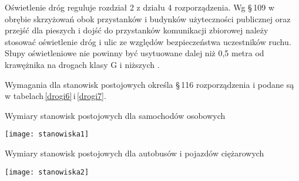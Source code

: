 \documentclass[twoside,12pt]{article}
\begin{document}
	Oświetlenie dróg reguluje rozdział 2 z działu 4 rozporządzenia. Wg §\,109 w obrębie skrzyżowań obok przystanków i budynków użyteczności publicznej oraz przejść dla pieszych i dojść do przystanków komunikacji zbiorowej należy stosować oświetlenie dróg i ulic ze względów bezpieczeństwa uczestników ruchu. Słupy oświetleniowe nie powinny być usytuowane dalej niż 0,5 metra od krawężnika na drogach klasy G i niższych \cite{rozporzadzenie_drogi}.
	
	Wymagania dla stanowisk postojowych określa §\,116 rozporządzenia i podane są w tabelach\,\ref{drogi6}\,i\,\ref{drogi7}.
	\begin{table}[H]
		\centering
		\caption{Wymiary stanowisk postojowych dla samochodów osobowych}
		\texttt{[image: stanowiska1]}\\
		\label{drogi6}
	\end{table}	
	
	\begin{table}[H]
		\centering
		\caption{Wymiary stanowisk postojowych dla autobusów i pojazdów ciężarowych}
		\texttt{[image: stanowiska2]}\\
		\label{drogi7}
	\end{table}	
	
\end{document}
